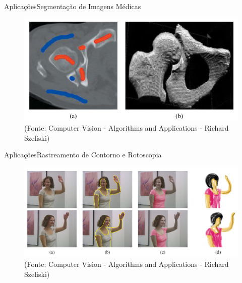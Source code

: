 \begin{frame}{Aplicações}{Segmentação de Imagens Médicas}

\begin{figure}
    \centering
    \includegraphics[scale=.4]{img/medical_image_segmentation.png}
    \caption{(Fonte: Computer Vision - Algorithms and Applications - Richard Szeliski)}
    \label{fig:medical_image_segmentation}
\end{figure}

\end{frame}

\begin{frame}{Aplicações}{Rastreamento de Contorno e Rotoscopia}

\begin{figure}
    \centering
    \includegraphics[scale=.6]{img/contour_trackin_rotoscoping.png}
    \caption{(Fonte: Computer Vision - Algorithms and Applications - Richard Szeliski)}
    \label{fig:contour_tracking_rotoscoping}
\end{figure}

\end{frame}

